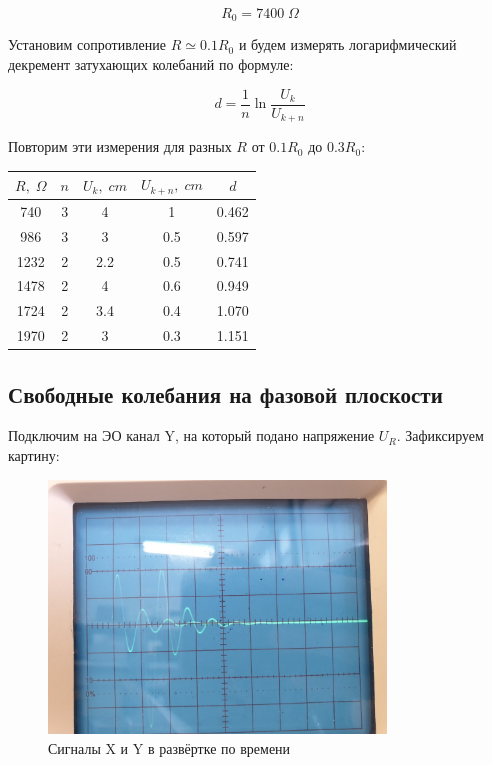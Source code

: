 \documentclass{article}
\begin{document}
\[ R_0 = 7400\; \Omega \]

Установим сопротивление \( R \simeq 0.1R_0 \) и будем измерять логарифмический декремент затухающих колебаний
по формуле:

\[ d = \frac{1}{n}\ln \frac{U_k}{U_{k+n}} \]

Повторим эти измерения для разных \( R \) от \( 0.1R_0 \) до \( 0.3R_0 \):

\begin{table}[H]
    \centering
    \begin{tabular}{|c|c|c|c|c|}
    \hline
    \(R,\; \Omega\) & \(n\) & \(U_k,\; cm \)& \(U_{k+n},\; cm\) & \(d\) \\\hline
    740   & 3 & 4    & 1          & 0.462 \\\hline
    986   & 3 & 3    & 0.5        & 0.597 \\\hline
    1232  & 2 & 2.2  & 0.5        & 0.741 \\\hline
    1478  & 2 & 4    & 0.6        & 0.949 \\\hline
    1724  & 2 & 3.4  & 0.4        & 1.070 \\\hline
    1970  & 2 & 3    & 0.3        & 1.151 \\\hline
    \end{tabular}
\end{table}

\subsection{Свободные колебания на фазовой плоскости} \label{sec:d}
Подключим на ЭО канал Y, на который подано напряжение \( U_R \). Зафиксируем картину:

\begin{figure}[H]
    \centering
    \includegraphics[width = 0.8\textwidth]{X_and_Y_time.jpg}
    \caption{Сигналы X и Y в развёртке по времени}
    \label{fig:XY_time}
\end{figure}
\end{document}
